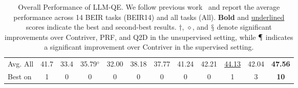 \begin{table*}[ht]
{\begin{tabular}{l|c|cc|cccccc|cc}
    Avg. All           & 41.7          & 33.4         & 35.79{$\text{}^{\diamond}$}         & 32.00  & 38.18          & 37.77         & 41.24         & 42.21\rlap{$\text{}^{\dagger \diamond}$}        & \uline{44.13}\rlap{$\text{}^{\dagger \diamond \mathsection}$}  & 42.04  & \textbf{47.56}\rlap{$\text{}^{\mathparagraph}$} \\
    Best on            & 1             & 0            & 0             & 0      & 0              & 0             & 0             & 0            & 1              & 3  
    & \textbf{10}             \\
    \hline
     
  \end{tabular}}
  \caption{Overall Performance of LLM-QE. We follow previous work~\cite{izacard2021unsupervised} and report the average performance across 14 BEIR tasks (BEIR14) and all tasks (All). \textbf{Bold} and \uline{underlined} scores indicate the best and second-best results. $\dagger$, $\diamond$, and $\mathsection$ denote significant improvements over Contriver, PRF, and Q2D in the unsupervised setting, while $\mathparagraph$ indicates a significant improvement over Contriver in the supervised setting.}
  \label{tab:overall}
\end{table*}

% 




    
    
